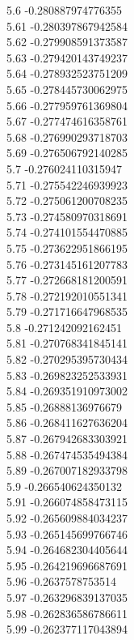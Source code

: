 {5.6	-0.280887974776355\\
5.61	-0.280397867942584\\
5.62	-0.279908591373587\\
5.63	-0.279420143749237\\
5.64	-0.278932523751209\\
5.65	-0.278445730062975\\
5.66	-0.277959761369804\\
5.67	-0.277474616358761\\
5.68	-0.276990293718703\\
5.69	-0.276506792140285\\
5.7	-0.276024110315947\\
5.71	-0.275542246939923\\
5.72	-0.275061200708235\\
5.73	-0.274580970318691\\
5.74	-0.274101554470885\\
5.75	-0.273622951866195\\
5.76	-0.273145161207783\\
5.77	-0.272668181200591\\
5.78	-0.272192010551341\\
5.79	-0.271716647968535\\
5.8	-0.271242092162451\\
5.81	-0.270768341845141\\
5.82	-0.270295395730434\\
5.83	-0.269823252533931\\
5.84	-0.269351910973002\\
5.85	-0.26888136976679\\
5.86	-0.268411627636204\\
5.87	-0.267942683303921\\
5.88	-0.267474535494384\\
5.89	-0.267007182933798\\
5.9	-0.266540624350132\\
5.91	-0.266074858473115\\
5.92	-0.265609884034237\\
5.93	-0.265145699766746\\
5.94	-0.264682304405644\\
5.95	-0.264219696687691\\
5.96	-0.2637578753514\\
5.97	-0.263296839137035\\
5.98	-0.262836586786611\\
5.99	-0.262377117043894\\
}
